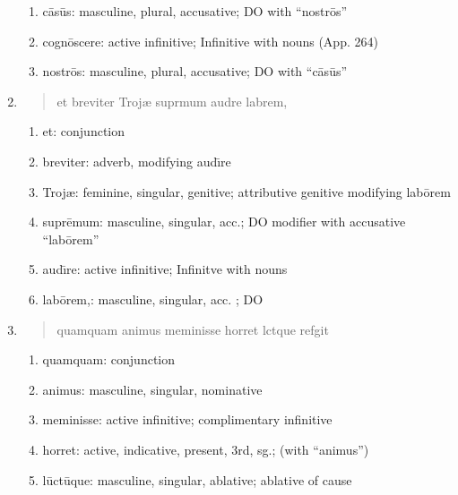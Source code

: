 \documentclass[]{article}
\newcommand{\latify}[1]{
        \Large
        \begin{verse}
          \begin{metrica}
          {#1}\\
          \end{metrica}
        \end{verse}
        \normalsize
}
\begin{document}
\begin{enumerate}
\begin{enumerate}
	\item c\={a}s\={u}s: masculine, plural, accusative; DO with ``nostr\={o}s''

	\item cogn\={o}scere:  active infinitive; Infinitive with nouns (App. 264)

	\item nostr\={o}s:  masculine, plural, accusative; DO with ``c\={a}s\={u}s''
\end{enumerate}


\item \latify{et breviter Troj{\ae} supr{}mum aud{\macron {\i}}re lab{\macron {o}}rem,}
\begin{enumerate}

	\item et:  conjunction

	\item breviter:  adverb, modifying aud\={\i}re

	\item Troj{\ae}:   feminine, singular, genitive; attributive genitive modifying lab\={o}rem

	\item supr\={e}mum: masculine, singular, acc.; DO modifier with accusative ``lab\={o}rem''

	\item aud\={\i}re:   active infinitive; Infinitve with nouns

	\item lab\={o}rem,:   masculine, singular, acc. ; DO 

\end{enumerate}


\item \latify{quamquam animus meminisse horret l{}ct{\macron {u}}que ref{\macron {u}}git}     
\begin{enumerate}

	\item quamquam:  conjunction

	\item animus:  masculine, singular, nominative

	\item meminisse: active infinitive; complimentary infinitive

	\item horret:  active, indicative, present, 3rd, sg.; (with ``animus'')

	\item l\={u}ct\={u}que: masculine, singular, ablative; ablative of cause


\end{enumerate}
\end{enumerate}
\end{document}
